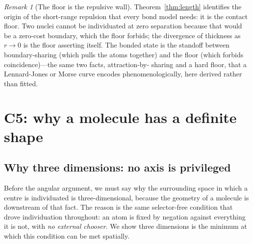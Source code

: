 \documentclass[11pt,a4paper]{article}
\theoremstyle{thmstyle}
\theoremstyle{definition}
\theoremstyle{remark}
\newtheorem{remark}[theorem]{Remark}
\begin{document}
\begin{remark}[The floor is the repulsive wall]
\label{rem:wall}
Theorem~\ref{thm:length} identifies the origin of the short-range
repulsion that every bond model needs: it is the contact floor. Two
nuclei cannot be individuated at zero separation because that would be a
zero-cost boundary, which the floor forbids; the divergence of thickness
as $r\to0$ is the floor asserting itself. The bonded state is the
standoff between boundary-sharing (which pulls the atoms together) and the
floor (which forbids coincidence)---the same two facts, attraction-by-
sharing and a hard floor, that a Lennard-Jones or Morse curve encodes
phenomenologically, here derived rather than fitted.
\end{remark}

\section{C5: why a molecule has a definite shape}
\label{sec:geometry}

\subsection{Why three dimensions: no axis is privileged}

Before the angular argument, we must say why the surrounding space in
which a centre is individuated is three-dimensional, because the geometry
of a molecule is downstream of that fact. The reason is the same
selector-free condition that drove individuation throughout: an atom is
fixed by negation against everything it is not, with \emph{no external
chooser}. We show three dimensions is the minimum at which this condition
can be met spatially.
\end{document}
